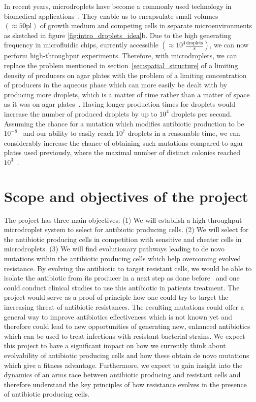 In recent years, microdroplets have become a commonly used technology in biomedical applications~\cite{Zagnoni2011-ko}. They enable us to encapsulate small volumes $ \left( \approx 50 \mathrm{pl} \right)$ of growth medium and competing cells in separate microenvironments as sketched in figure \ref{fig:intro_droplets_idea}b. Due to the high generating frequency in microfluidic chips, currently accessible $\left( \approx 10^4 \frac{\mathrm{droplets}}{\mathrm{s}} \right) $, we can now perform high-throughput experiments.
Therefore, with microdroplets, we can replace the problem mentioned in section~\ref{sec:spatial_structure} of a limiting density of producers on agar plates with the problem of a limiting concentration of producers in the aqueous phase which can more easily be dealt with by producing more droplets, which is a matter of time rather than a matter of space as it was on agar plates~\cite{Gerardin2016-ac}. Having longer production times for droplets would increase the number of produced droplets by up to $10^4$ droplets per second.
Assuming the chance for a mutation which modifies antibiotic production to be $10^{-8}$~\cite{Drake1998-es, Kunkel2004, Wielgoss2011-jd} and our ability to easily reach $10^7$ droplets in a reasonable time, we can considerably increase the chance of obtaining such mutations compared to agar plates used previously, where the maximal number of distinct colonies reached $10^3$~\cite{Gerardin2016-ac}.

\section{Scope and objectives of the project}

The project has three main objectives:
(1) We will establish a high-throughput microdroplet system to select for antibiotic producing cells.
(2) We will select for the antibiotic producing cells in competition with sensitive and cheater cells in microdroplets.
(3) We will find evolutionary pathways leading to de novo mutations within the antibiotic producing cells which help overcoming evolved resistance.
By evolving the antibiotic to target resistant cells, we would be able to isolate the antibiotic from its producer in a next step as done before~\cite{Singh2018-qp} and one could conduct clinical studies to use this antibiotic in patients treatment. The project would serve as a proof-of-principle how one could try to target the increasing threat of antibiotic resistances.
The resulting mutations could offer a general way to improve antibiotics effectiveness which is not known yet and therefore could lead to new opportunities of generating new, enhanced antibiotics which can be used to treat infections with resistant bacterial strains.
We expect this project to have a significant impact on how we currently think about evolvability of antibiotic producing cells and how these obtain de novo mutations which give a fitness advantage. Furthermore, we expect to gain insight into the dynamics of an arms race between antibiotic producing and resistant cells and therefore understand the key principles of how resistance evolves in the presence of antibiotic producing cells.


